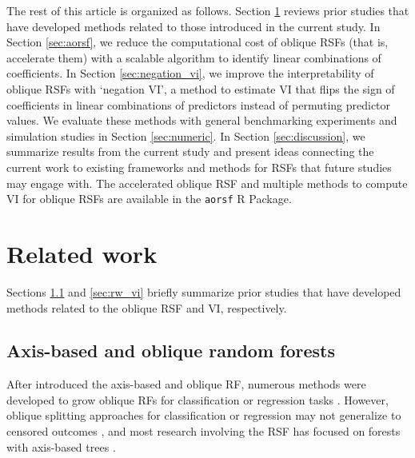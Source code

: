 \documentclass{article}\usepackage[]{graphicx}\usepackage[]{xcolor}
\newcommand{\ie}{that is}
\newcommand{\eg}{for example}
\newcommand{\secref}[1]{Section \ref{#1}}
\begin{document}
The rest of this article is organized as follows. \secref{sec:background} reviews prior studies that have developed methods related to those introduced in the current study. In \secref{sec:aorsf}, we reduce the computational cost of oblique RSFs (\ie, accelerate them) with a scalable algorithm to identify linear combinations of coefficients. In \secref{sec:negation_vi}, we improve the interpretability of oblique RSFs with `negation VI', a method to estimate VI that flips the sign of coefficients in linear combinations of predictors instead of permuting predictor values. We evaluate these methods with general benchmarking experiments and simulation studies in \secref{sec:numeric}. In \secref{sec:discussion}, we summarize results from the current study and present ideas connecting the current work to existing frameworks and methods for RSFs that future studies may engage with. The accelerated oblique RSF and multiple methods to compute VI for oblique RSFs are available in the \texttt{aorsf} R Package.






\section{Related work} \label{sec:background}

Sections \ref{sec:rw_forests} and \ref{sec:rw_vi} briefly summarize prior studies that have developed methods related to the oblique RSF and VI, respectively.

\subsection{Axis-based and oblique random forests} \label{sec:rw_forests}

After \citet{breiman2001random} introduced the axis-based and oblique RF, numerous methods were developed to grow oblique RFs for classification or regression tasks \citep{menze2011oblique, zhang2014oblique, rainforth2015canonical, zhu2015reinforcement, poona2016investigating, qiu2017oblique, tomita2020sparse, katuwal2020heterogeneous}. However, oblique splitting approaches for classification or regression may not generalize to censored outcomes \citep[\eg, see][Section~4.5.1]{zhu2013tree}, and most research involving the RSF has focused on forests with axis-based trees \citep{wang2017selective}.
\end{document}
